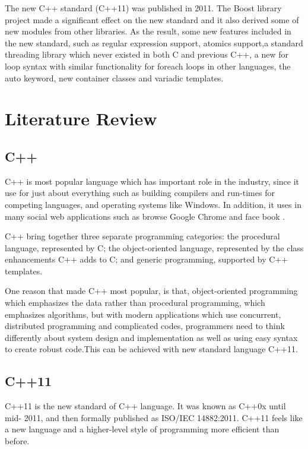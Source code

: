 \documentclass[11pt]{report}
\begin{document}
The new C++ standard (C++11) was published in 2011. The Boost library project made a significant effect on the new standard and it also derived some of new modules from other libraries. As the result, some new features included in the new standard, such as regular expression support, atomics support,\linebreak a standard threading library which never existed in both C and previous C++, a new for loop syntax with similar functionality for foreach loops in other \linebreak languages, the auto keyword, new container classes and variadic templates\cite{CplusplusHistoryofCpp}. 


\chapter{Literature Review}

\section{C++}
\label{section: C++}
C++ is most popular language which has important role in the industry, since it use for just about everything such as building compilers and run-times for competing languages, and operating systems like Windows. In addition, it uses in many social web applications such as browse Google Chrome and face book \cite{ISO:2011:Cpplanguage}.

C++ bring together three separate programming categories: the procedural language, represented by C; the object-oriented language, represented by the class enhancements C++ adds to C; and generic programming, supported by C++ templates\cite{Prata:2012:Cpp}.

One reason that made C++ most popular, is that, object-oriented \linebreak programming which emphasizes the data rather than procedural programming, which emphasizes algorithms, but with modern applications which use \linebreak concurrent, distributed programming and complicated codes, programmers need to think differently about system design and implementation as well as using easy syntax  to create robust code.This can be achieved with new standard \linebreak language C++11\cite{Stroustrup:2012:Cpp11}.

\section{C++11}
\label{section: C++11}
C++11 is the new standard of C++ language. It was known as C++0x until mid- 2011, and then formally published as ISO/IEC 14882:2011. C++11 feels like a new language and a higher-level style of programming more efficient than before\cite{ISO:2011:Cpplanguage}. 
\end{document}
